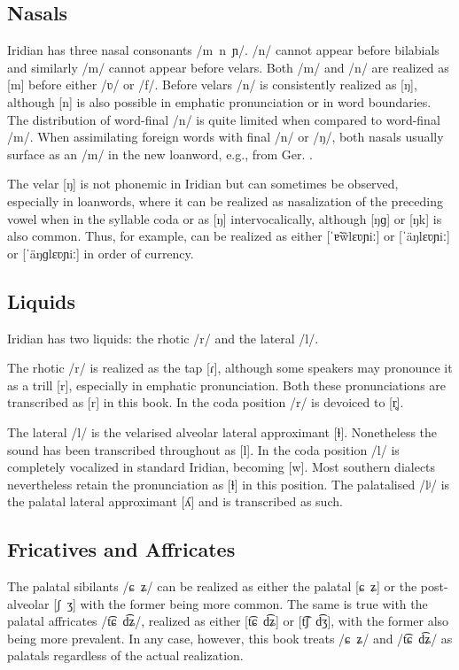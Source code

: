 \subsection{Nasals}
Iridian has three nasal consonants /m~n~ɲ/. /n/ cannot appear before bilabials
and similarly /m/ cannot appear before velars. Both /m/ and /n/ are realized as
[m] before either /ʋ/ or /f/. Before velars /n/ is consistently realized as [ŋ],
although [n] is also possible in emphatic pronunciation or in word boundaries.
The distribution of word-final /n/ is quite limited when compared to word-final
/m/. When assimilating foreign words with final /n/ or /ŋ/, both nasals usually
surface as an /m/ in the new loanword, e.g.,  from
Ger. . 

The velar [ŋ] is not phonemic in Iridian but can sometimes be observed,
especially in loanwords, where it can be realized as nasalization of the
preceding vowel when in the syllable coda or as [ŋ] intervocalically, although
[ŋɡ] or [ŋk] is also common. Thus, for example,  can be
realized as either [ˈɐ̃w̃lɛʋɲiː] or [ˈäŋlɛʋɲiː] or [ˈäŋɡlɛʋɲiː] in order of
currency.

\subsection{Liquids}

Iridian has two liquids: the rhotic /r/ and the lateral /l/.

The rhotic /r/ is realized as the tap [ɾ], although some speakers may pronounce
it as a trill [r], especially in emphatic pronunciation. Both these
pronunciations are transcribed as [r] in this book. In the coda position /r/ is
devoiced to [r̥].

The lateral /l/ is  the velarised alveolar lateral approximant [ɫ]. Nonetheless
the sound has been transcribed throughout as [l]. In the coda position /l/ is
completely vocalized in standard Iridian, becoming [w]. Most southern dialects
nevertheless retain the pronunciation as [ɫ] in this position. The palatalised
/lʲ/ is the palatal lateral approximant [ʎ] and is transcribed as such.

\subsection{Fricatives and Affricates}

The palatal sibilants /ɕ~ʑ/ can be realized as either the palatal [ɕ~ʑ] or the
post-alveolar [ʃ~ʒ] with the former being more common. The same is true with the
palatal affricates /t͡ɕ~d͡ʑ/, realized as either [t͡ɕ~d͡ʑ] or [t͡ʃ~d͡ʒ], with
the former also being more prevalent. In any case, however, this book treats
/ɕ~ʑ/ and /t͡ɕ~d͡ʑ/ as palatals regardless of the actual realization.

